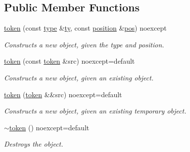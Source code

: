 \subsection*{Public Member Functions}
\begin{DoxyCompactItemize}
\item 
\hypertarget{classbfjit_1_1token_ac79751d52b4c7d1e3651d9e4cc541641}{}\label{classbfjit_1_1token_ac79751d52b4c7d1e3651d9e4cc541641} 
\hyperlink{classbfjit_1_1token_ac79751d52b4c7d1e3651d9e4cc541641}{token} (const \hyperlink{classbfjit_1_1token_a2486a3e583fb48f3863c4eb5c32cdd96}{type} \&\hyperlink{classbfjit_1_1token_a110492faa8b37b72a99aca257e584b9b}{ty}, const \hyperlink{classbfjit_1_1position}{position} \&\hyperlink{classbfjit_1_1token_aaebe0e1d3ab07f029478e13f7497a213}{pos}) noexcept
\begin{DoxyCompactList}\small\item\em Constructs a new object, given the type and position. \end{DoxyCompactList}\item 
\hypertarget{classbfjit_1_1token_a28e5edcefe7171cf2bb0da417e38e81a}{}\label{classbfjit_1_1token_a28e5edcefe7171cf2bb0da417e38e81a} 
\hyperlink{classbfjit_1_1token_a28e5edcefe7171cf2bb0da417e38e81a}{token} (const \hyperlink{classbfjit_1_1token}{token} \&src) noexcept=default
\begin{DoxyCompactList}\small\item\em Constructs a new object, given an existing object. \end{DoxyCompactList}\item 
\hypertarget{classbfjit_1_1token_a8e179dcaf1201498e5b2399d8f9a3481}{}\label{classbfjit_1_1token_a8e179dcaf1201498e5b2399d8f9a3481} 
\hyperlink{classbfjit_1_1token_a8e179dcaf1201498e5b2399d8f9a3481}{token} (\hyperlink{classbfjit_1_1token}{token} \&\&src) noexcept=default
\begin{DoxyCompactList}\small\item\em Constructs a new object, given an existing temporary object. \end{DoxyCompactList}\item 
\hypertarget{classbfjit_1_1token_a5f5b1bec19166c1eeeaa3d6ac9c854f0}{}\label{classbfjit_1_1token_a5f5b1bec19166c1eeeaa3d6ac9c854f0} 
\hyperlink{classbfjit_1_1token_a5f5b1bec19166c1eeeaa3d6ac9c854f0}{$\sim$token} () noexcept=default
\begin{DoxyCompactList}\small\item\em Destroys the object. \end{DoxyCompactList}\item 

\end{DoxyCompactItemize}
